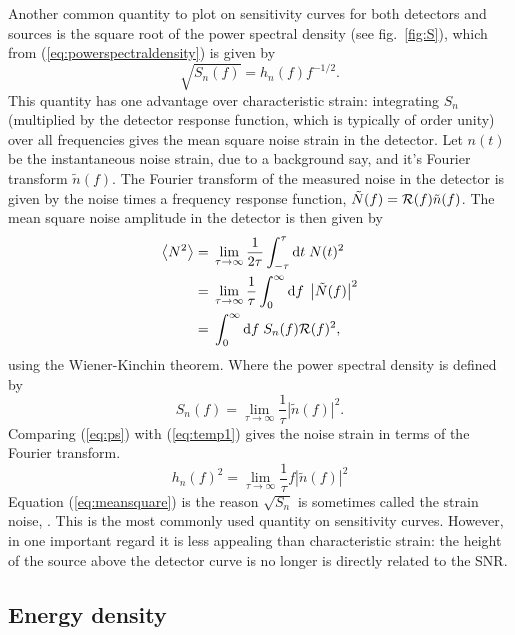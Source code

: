 \documentclass[fleqn,12pt]{iopart}
\newcommand{\dd}{\ensuremath{\mathrm{d}}}
\begin{document}
Another common quantity to plot on sensitivity curves for both detectors and sources is the square root of the power spectral density (see fig.~\ref{fig:S}), which from (\ref{eq:powerspectraldensity}) is given by
\begin{equation}
\label{eq:temp1}
\sqrt{S_{n}(f)} = h_{n}(f)f^{-1/2}.
\end{equation}
This quantity has one advantage over characteristic strain: integrating $S_{n}$ (multiplied by the detector response function, which is typically of order unity) over all frequencies gives the mean square noise strain in the detector. Let $n(t)$ be the instantaneous noise strain, due to a background say, and it's Fourier transform $\tilde{n}(f)$. The Fourier transform of the measured noise in the detector is given by the noise times a frequency response function, $\tilde{N}(f) = {\cal{R}}(f)\tilde{n}(f)$. The mean square noise amplitude in the detector is then given by
\begin{align} \label{eq:meansquare}
\left< N^{2} \right> = {} & \lim_{\tau \rightarrow \infty} \frac{1}{2\tau} \int_{-\tau}^{\tau}\dd t\; N(t)^{2} \nonumber \\
 = {} & \lim_{\tau\rightarrow\infty}\frac{1}{\tau}\int_{0}^{\infty}\dd f\;\left|\tilde{N}(f)\right|^{2} \nonumber\\
 = {} & \int_{0}^{\infty}\dd f\; S_{n}(f){\cal{R}}(f)^{2},
\end{align}
using the Wiener-Kinchin theorem. Where the power spectral density is defined by
\begin{equation}\label{eq:ps}
S_{n}(f) = \lim_{\tau\rightarrow\infty}\frac{1}{\tau}\left|\tilde{n}(f)\right|^{2}.
\end{equation}
Comparing (\ref{eq:ps}) with (\ref{eq:temp1}) gives the noise strain in terms of the Fourier transform.
\begin{equation}
h_{n}(f)^{2} = \lim_{\tau\rightarrow\infty}\frac{1}{\tau}f\left| \tilde{n}(f) \right|^{2}
\end{equation}
Equation (\ref{eq:meansquare}) is the reason $\sqrt{S_{n}}$ is sometimes called the strain noise, \citet{Phinney}. This is the most commonly used quantity on sensitivity curves. However, in one important regard it is less appealing than characteristic strain: the height of the source above the detector curve is no longer is directly related to the SNR.

\subsection{Energy density}
\end{document}
